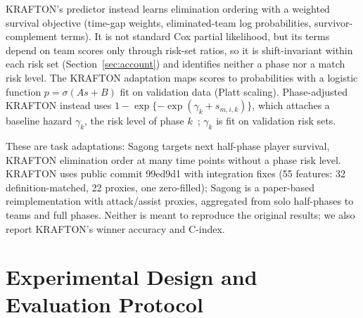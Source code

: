 \documentclass[sigconf,anonymous]{acmart}
\begin{document}
KRAFTON's predictor instead learns elimination ordering with a weighted survival objective (time-gap weights, eliminated-team log probabilities, survivor-complement terms). It is not standard Cox partial likelihood, but its terms depend on team scores only through risk-set ratios, so it is shift-invariant within each risk set (Section~\ref{sec:account}) and identifies neither a phase nor a match risk level. The KRAFTON adaptation maps scores to probabilities with a logistic function $p=\sigma(A s+B)$ fit on validation data (Platt scaling). Phase-adjusted KRAFTON instead uses $1-\exp\{-\exp(\gamma_k+s_{m,i,k})\}$, which attaches a baseline hazard $\gamma_k$, the risk level of phase $k$~\cite{PrenticeGloeckler78}; $\gamma_k$ is fit on validation risk sets.

These are task adaptations: Sagong targets next half-phase player survival, KRAFTON elimination order at many time points without a phase risk level. KRAFTON uses public commit 99ed9d1 with integration fixes (55 features: 32 definition-matched, 22 proxies, one zero-filled); Sagong is a paper-based reimplementation with attack/assist proxies, aggregated from solo half-phases to teams and full phases. Neither is meant to reproduce the original results; we also report KRAFTON's winner accuracy and C-index.

\section{Experimental Design and Evaluation Protocol}
\label{sec:method:evaluation}
\end{document}
